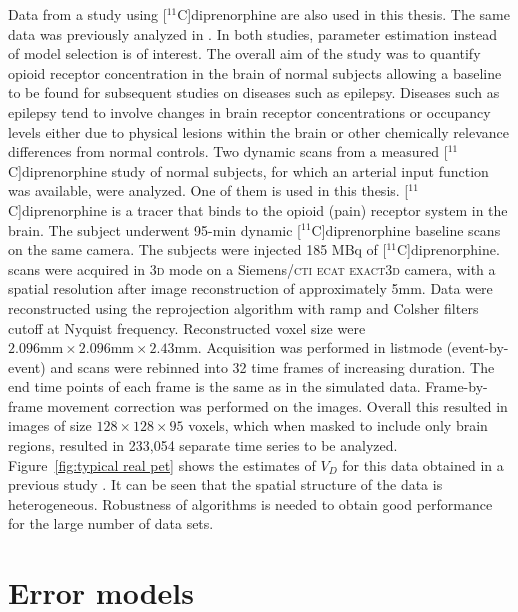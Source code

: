 Data from a \pet study using [$^{11}$C]diprenorphine are also used in this
thesis. The same data was previously analyzed in
\cite{Peng:2008fx,Jiang:2009kf}. In both studies, parameter estimation
instead of model selection is of interest. The overall aim of the study was
to quantify opioid receptor concentration in the brain of normal subjects
allowing a baseline to be found for subsequent studies on diseases such as
epilepsy. Diseases such as epilepsy tend to involve changes in brain receptor
concentrations or occupancy levels either due to physical lesions within the
brain or other chemically relevance differences from normal controls. Two
dynamic scans from a measured [$^{11}$C]diprenorphine study of normal
subjects, for which an arterial input function was available, were analyzed.
One of them is used in this thesis. [$^{11}$C]diprenorphine is a tracer that
binds to the opioid (pain) receptor system in the brain. The subject
underwent 95-min dynamic [$^{11}$C]diprenorphine \pet baseline scans on the
same camera. The subjects were injected 185 MBq of [$^{11}$C]diprenorphine.
\pet scans were acquired in \textsc{3d} mode on a Siemens/\textsc{cti ecat
exact3d} \pet camera, with a spatial resolution after image reconstruction of
approximately 5{}mm. Data were reconstructed using the reprojection algorithm
\citep{Kinahan1989} with ramp and Colsher filters cutoff at Nyquist
frequency. Reconstructed voxel size were $2.096 \text{mm} \times 2.096
\text{mm} \times2.43 \text{mm}$. Acquisition was performed in listmode
(event-by-event) and scans were rebinned into 32 time frames of increasing
duration. The end time points of each frame is the same as in the simulated
data. Frame-by-frame movement correction was performed on the \pet images.
Overall this resulted in images of size $128\times128\times95$ voxels, which
when masked to include only brain regions, resulted in 233,054 separate time
series to be analyzed. Figure~\ref{fig:typical real pet} shows the estimates
of $V_D$ for this data obtained in a previous study \cite{Zhou2013}. It can
be seen that the spatial structure of the data is heterogeneous. Robustness
of algorithms is needed to obtain good performance for the large number of
data sets.

\section{Error models}
\label{sec:Error models}

